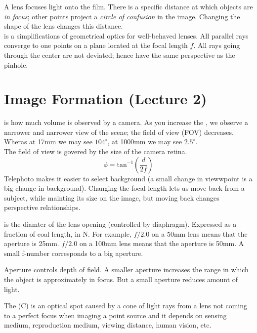 \documentclass{article}
\begin{document}
A lens focuses light onto the film. There is a specific distance at which objects are \emph{in focus}; other points project a \emph{circle of confusion} in the image. Changing the shape of the lens changes this distance. \\ 

 is a simplifications of geometrical optics for well-behaved lenses. All parallel rays converge to one points on a plane located at the focal length $f$. All rays going through the center are not deviated; hence have the same perspective as the pinhole.

\section{Image Formation (Lecture 2)}

 is how much volume is observed by a camera. As you increase the , we observe a narrower and narrower view of the scene; the field of view (FOV) decreases. Wheras at 17mm we may see $104^\circ$, at 1000mm we may see $2.5^\circ$. \\ 

The field of view is govered by the size of the camera retina. $$\phi = \textrm{tan}^{-1}(\frac{d}{2f})$$ Telephoto makes it easier to select background (a small change in viewwpoint is a big change in background). Changing the focal length lets us move back from a subject, while mainting its size on the image, but moving back changes perspective relationships. 

\begin{definition}[Aperture]
  is the diamter of the lens opening (controlled by diaphragm). Expressed as a fraction of coal length, in  N. For example, $f/2.0$ on a 50mm lens means that the aperture is 25mm. $f/2.0$ on a 100mm lens means that the aperture is 50mm. A small f-number corresponds to a big aperture. 
\end{definition}
 
\begin{remark}
  Aperture controls depth of field. A smaller aperture increases the range in which the object is approximately in focus. But a small aperture reduces amount of light. \\ 
\end{remark}

The  (C) is an optical spot caused by a cone of light rays from a lens not coming to a perfect focus when imaging a point source and it depends on sensing medium, reproduction medium, viewing distance, human vision, etc. 
\end{document}
